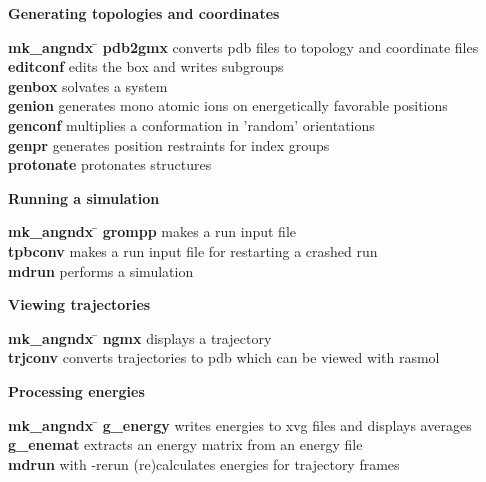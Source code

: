 \begin{description}
\item {\large\bf Generating topologies and coordinates}
\begin{tabbing}
{\bf mk\_angndx} \= \kill
{\bf pdb2gmx} \> converts pdb files to topology and coordinate files  \\
{\bf editconf} \> edits the box and writes subgroups  \\
{\bf genbox} \> solvates a system \\
{\bf genion} \> generates mono atomic ions on energetically favorable positions \\
{\bf genconf} \> multiplies a conformation in 'random' orientations \\
{\bf genpr} \> generates position restraints for index groups \\
{\bf protonate} \> protonates structures \\
\end{tabbing}

\item {\large\bf Running a simulation}
\begin{tabbing}
{\bf mk\_angndx} \= \kill
{\bf grompp} \> makes a run input file \\
{\bf tpbconv} \> makes a run input file for restarting a crashed run \\
{\bf mdrun} \> performs a simulation \\
\end{tabbing}

\item {\large\bf Viewing trajectories}
\begin{tabbing}
{\bf mk\_angndx} \= \kill
{\bf ngmx} \> displays a trajectory \\
{\bf trjconv} \> converts trajectories to {\eg} pdb which can be viewed with {\eg} rasmol \\
\end{tabbing}

\item {\large\bf Processing energies}
\begin{tabbing}
{\bf mk\_angndx} \= \kill
{\bf g\_energy} \> writes energies to xvg files and displays averages \\
{\bf g\_enemat} \> extracts an energy matrix from an energy file \\
{\bf mdrun} \> with -rerun (re)calculates energies for trajectory frames \\
\end{tabbing}


\end{description}
